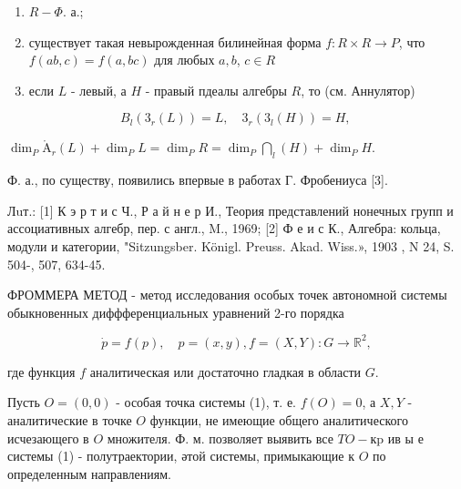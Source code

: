 \documentclass[10pt]{article}
\def\AA{\mathring{\mathrm{A}}}
\begin{document}
\begin{enumerate}

  \item $R-\Phi$. а.;



  \item существует такая невырожденная билинейная форма $f: R \times R \rightarrow P$, что $f(a b, c)=f(a, b c)$ для любых $a, b$, $c \in R$



  \item если $L$ - левый, а $H$ - правый пдеалы алгебры $R$, то (см. Аннулятор)



\end{enumerate}



\[

B_{l}\left(3_{r}(L)\right)=L, \quad 3_{r}\left(3_{l}(H)\right)=H \text {, }

\]



$\operatorname{dim}_{P} \AA_{r}(L)+\operatorname{dim}_{P} L=\operatorname{dim}_{P} R=\operatorname{dim}_{P} \bigcap_{l}(H)+\operatorname{dim}_{P} H$.



Ф. а., по существу, появились впервые в работах Г. Фробениуса [3].



Лuт.: [1] К э р т и с Ч., Р а й н е р И., Теория представлений нонечных групп и ассоциативных алгебр, пер. с англ., M., 1969; [2] Ф е и с К., Алгебра: кольца, модули и категории, "Sitzungsber. Königl. Preuss. Akad. Wiss.», 1903 , N 24, S. 504-, 507, 634-45.



ФРОММЕРА МЕТОД - метод исследования особых точек автономной системы обыкновенных диффференциальных уравнений 2-го порядка



\[

\dot{p}=f(p), \quad p=(x, y), f=(X, Y): G \longrightarrow \mathbb{R}^{2},

\]



где функция $f$ аналитическая или достаточно гладкая в области $G$.



Пусть $O=(0,0)$ - особая точка системы (1), т. е. $f(O)=0$, а $X, Y$ - аналитические в точке $O$ функции, не имеющие общего аналитического исчезающего в $O$ множителя. Ф. м. позволяет выявить все $T O-к \mathrm{p}$ ив ы е системы (1) - полутраектории, әтой системы, примыкающие к $O$ по определенным направлениям.
\end{document}
